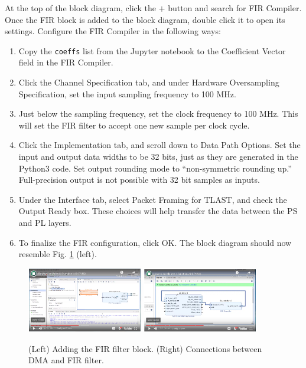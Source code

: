 \documentclass{article}
\begin{document}
\clearpage

\noindent
At the top of the block diagram, click the $+$ button and search for FIR Compiler.  Once the FIR block is added to the block diagram, double click it to open its settings.  Configure the FIR Compiler in the following ways:

\begin{enumerate}
\item Copy the \verb+coeffs+ list from the Jupyter notebook to the Coefficient Vector field in the FIR Compiler.
\item Click the Channel Specification tab, and under Hardware Oversampling Specification, set the input sampling frequency to 100 MHz.
\item Just below the sampling frequency, set the clock frequency to 100 MHz.  This will set the FIR filter to accept one new sample per clock cycle.
\item Click the Implementation tab, and scroll down to Data Path Options.  Set the input and output data widths to be 32 bits, just as they are generated in the Python3 code.  Set output rounding mode to ``non-symmetric rounding up.''  Full-precision output is not possible with 32 bit samples as inputs.
\item Under the Interface tab, select Packet Framing for TLAST, and check the Output Ready box.  These choices will help transfer the data between the PS and PL layers.
\item To finalize the FIR configuration, click OK.  The block diagram should now resemble Fig. \ref{fig:vid_3} (left).
\end{enumerate}

\begin{figure}
\centering
\includegraphics[width=0.45\textwidth]{fir_video_3.png}
\includegraphics[width=0.45\textwidth]{fir_video_4.png}
\caption{\label{fig:vid_3} (Left) Adding the FIR filter block. (Right) Connections between DMA and FIR filter.}
\end{figure}
\end{document}
